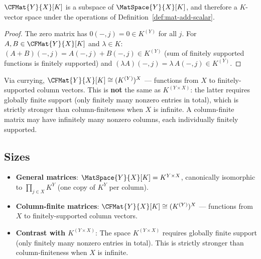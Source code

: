\begin{proposition}
\label{prop:cfmat-subspace}
    $\CFMat{Y}{X}[K]$ is a subspace of $\MatSpace{Y}{X}[K]$, and therefore a $K$-vector space
    under the operations of Definition~\ref{def:mat-add-scalar}.
\end{proposition}

\begin{proof}
    The zero matrix has $0(-,j) = 0 \in K^{(Y)}$ for all $j$.
    For $A, B \in \CFMat{Y}{X}[K]$ and $\lambda \in K$:
    $(A + B)(-,j) = A(-,j) + B(-,j) \in K^{(Y)}$ (sum of finitely supported functions
    is finitely supported) and $(\lambda A)(-,j) = \lambda\, A(-,j) \in K^{(Y)}$.
\end{proof}

\begin{remark}
    Via currying, $\CFMat{Y}{X}[K] \cong (K^{(Y)})^X$ --- functions from $X$ to
    finitely-supported column vectors. This is \textbf{not} the same as $K^{(Y \times X)}$:
    the latter requires globally finite support (only finitely many nonzero entries in total),
    which is strictly stronger than column-finiteness when $X$ is infinite. A column-finite
    matrix may have infinitely many nonzero columns, each individually finitely supported.
\end{remark}

\subsection{Sizes}

\begin{remark}
    \leavevmode
    \begin{itemize}
        \item \textbf{General matrices}: $\MatSpace{Y}{X}[K] = K^{Y \times X}$, canonically
              isomorphic to $\prod_{j \in X} K^Y$ (one copy of $K^Y$ per column).
        \item \textbf{Column-finite matrices}: $\CFMat{Y}{X}[K] \cong (K^{(Y)})^X$ --- functions
              from $X$ to finitely-supported column vectors.
        \item \textbf{Contrast with $K^{(Y \times X)}$}: The space $K^{(Y \times X)}$ requires
              globally finite support (only finitely many nonzero entries in total). This is
              strictly stronger than column-finiteness when $X$ is infinite.
    \end{itemize}
\end{remark}

